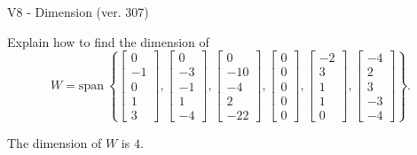 \begin{exercise}
  \begin{exerciseTitle}V8 - Dimension (ver. 307)\end{exerciseTitle}
  \begin{exerciseStatement}
    Explain how to find the dimension of 
\[W=\mathrm{span}\ \left\{\left[\begin{array}{r}
0 \\
-1 \\
0 \\
1 \\
3
\end{array}\right] , \left[\begin{array}{r}
0 \\
-3 \\
-1 \\
1 \\
-4
\end{array}\right] , \left[\begin{array}{r}
0 \\
-10 \\
-4 \\
2 \\
-22
\end{array}\right] , \left[\begin{array}{r}
0 \\
0 \\
0 \\
0 \\
0
\end{array}\right] , \left[\begin{array}{r}
-2 \\
3 \\
1 \\
1 \\
0
\end{array}\right] , \left[\begin{array}{r}
-4 \\
2 \\
3 \\
-3 \\
-4
\end{array}\right]\right\}.\]



  \end{exerciseStatement}
  \begin{exerciseAnswer}
   The dimension of \(W\) is  \(4\).
  


  \end{exerciseAnswer}
\end{exercise}